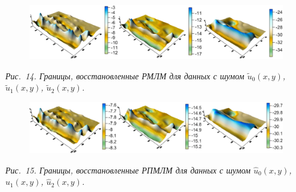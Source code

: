 \documentclass[10pt,pdf, mathserif, hyperref={unicode}]{beamer}
\begin{document}
\begin{frame}
	\begin{figure}
		\centering
		\includegraphics[height=0.2\textheight]{lm_noise}
	\end{figure}
	\centering\textit{Рис.~14. Границы, восстановленные РМЛМ для данных с шумом $\tilde{u}_0(x,y)$, $\tilde{u}_1(x,y)$, $\tilde{u}_2(x,y)$.}
	\begin{figure}
		\centering
		\includegraphics[height=0.2\textheight]{clm_noise}
	\end{figure}
	\centering\textit{Рис.~15. Границы, восстановленные РПМЛМ для данных с шумом $\hat{u}_0(x,y)$, $\hat{u}_1(x,y)$, $\hat{u}_2(x,y)$.}
\end{frame}
\end{document}
